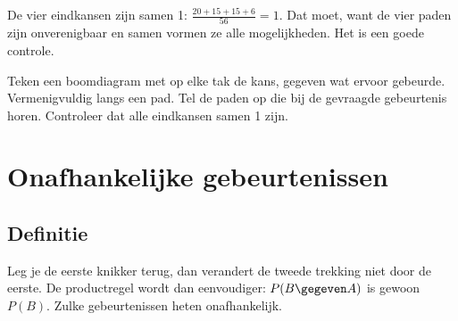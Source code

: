 De vier eindkansen zijn samen 1: $\frac{20 + 15 + 15 + 6}{56} = 1$. Dat moet, want de vier paden zijn onverenigbaar en samen vormen ze alle mogelijkheden. Het is een goede controle.

\begin{werkwijze}
Teken een boomdiagram met op elke tak de kans, gegeven wat ervoor gebeurde. Vermenigvuldig langs een pad. Tel de paden op die bij de gevraagde gebeurtenis horen. Controleer dat alle eindkansen samen 1 zijn.
\end{werkwijze}

\begin{oefeningen}

\end{oefeningen}

\section{Onafhankelijke gebeurtenissen}

\subsection{Definitie}

Leg je de eerste knikker terug, dan verandert de tweede trekking niet door de eerste. De productregel wordt dan eenvoudiger: $P(B \gegeven A)$ is gewoon $P(B)$. Zulke gebeurtenissen heten onafhankelijk.

